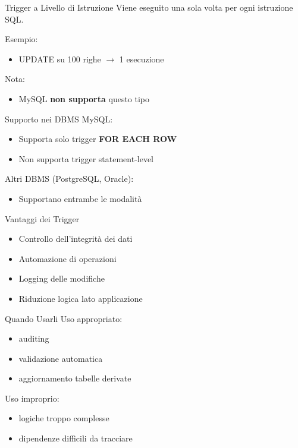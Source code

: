 \documentclass{beamer}
\begin{document}
	\begin{frame}{Trigger a Livello di Istruzione}
		Viene eseguito una sola volta per ogni istruzione SQL.
		
		\bigskip
		
		Esempio:
		\begin{itemize}
			\item UPDATE su 100 righe $\rightarrow$ 1 esecuzione
		\end{itemize}
		
		\bigskip
		
		Nota:
		\begin{itemize}
			\item MySQL \textbf{non supporta} questo tipo
		\end{itemize}
	\end{frame}
	
	\begin{frame}{Supporto nei DBMS}
		MySQL:
		\begin{itemize}
			\item Supporta solo trigger \textbf{FOR EACH ROW}
			\item Non supporta trigger statement-level
		\end{itemize}
		
		\bigskip
		
		Altri DBMS (PostgreSQL, Oracle):
		\begin{itemize}
			\item Supportano entrambe le modalità
		\end{itemize}
	\end{frame}
	
	\begin{frame}{Vantaggi dei Trigger}
		\begin{itemize}
			\item Controllo dell'integrità dei dati
			\item Automazione di operazioni
			\item Logging delle modifiche
			\item Riduzione logica lato applicazione
		\end{itemize}
	\end{frame}
	
	\begin{frame}{Quando Usarli}
		Uso appropriato:
		\begin{itemize}
			\item auditing
			\item validazione automatica
			\item aggiornamento tabelle derivate
		\end{itemize}
		
		\bigskip
		
		Uso improprio:
		\begin{itemize}
			\item logiche troppo complesse
			\item dipendenze difficili da tracciare
		\end{itemize}
	\end{frame}
	
\end{document}
